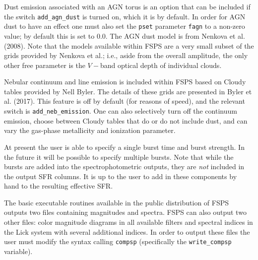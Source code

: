\documentclass[]{article}
\begin{document}
\noindent
Dust emission associated with an AGN torus is an option that can be included if
the switch \texttt{add\_agn\_dust} is turned on, which it is by default.  In
order for AGN dust to have an effect one must also set the \texttt{pset}
parameter \texttt{fagn} to a non-zero value; by default this is set to 0.0.  The
AGN dust model is from Nenkova et al. (2008).  Note that the models available
within FSPS are a very small subset of the grids provided by Nenkova et al.;
i.e., aside from the overall amplitude, the only other free parameter is the
$V-$band optical depth of individual clouds.

\vspace{0.1in}
\vspace{0.1in}

\noindent
Nebular continuum and line emission is included within FSPS based on Cloudy
tables provided by Nell Byler.  The details of these grids are presented in
Byler et al. (2017).   This feature is off by default (for reasons of speed),
and the relevant switch is \texttt{add\_neb\_emission}.  One can also
selectively turn off the continuum emission, choose between Cloudy tables that
do or do not include dust, and can vary the gas-phase metallicity and ionization
parameter.

\vspace{0.1in}
\vspace{0.1in}

\noindent
At present the user is able to specify a single burst time and burst strength.
In the future it will be possible to specify multiple bursts.  Note that while
the bursts are added into the spectrophotometric outputs, they are {\it not}
included in the output SFR columns.  It is up to the user to add in these
components by hand to the resulting effective SFR.

\vspace{0.1in}
\vspace{0.1in}

\noindent
The basic executable routines available in the public distribution of FSPS
outputs two files containing magnitudes and spectra.  FSPS can also output two
other files: color magnitude diagrams in all available filters and spectral
indices in the Lick system with several additional indices.  In order to output
these files the user must modify the syntax calling \texttt{compsp}
(specifically the \texttt{write\_compsp} variable).
\end{document}
